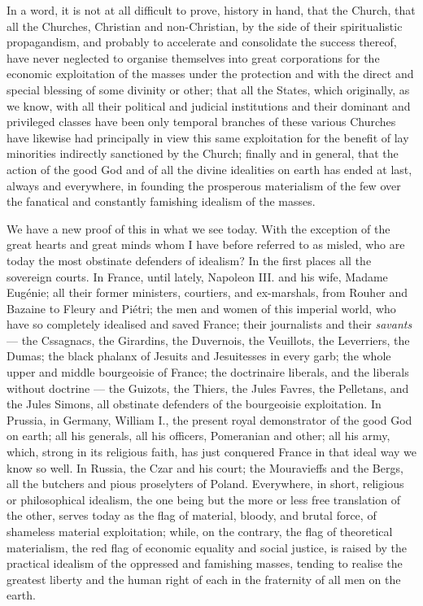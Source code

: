 \documentclass[12pt]{report}
\begin{document}
In a word, it is not at all difficult to prove, history in hand, that the Church, that all the Churches, Christian and non-Christian, by the side of their spiritualistic propagandism, and probably to accelerate and consolidate the success thereof, have never neglected to organise themselves into great corporations for the economic exploitation of the masses under the protection and with the direct and special blessing of some divinity or other; that all the States, which originally, as we know, with all their political and judicial institutions and their dominant and privileged classes have been only temporal branches of these various Churches have likewise had principally in view this same exploitation for the benefit of lay minorities indirectly sanctioned by the Church; finally and in general, that the action of the good God and of all the divine idealities on earth has ended at last, always and everywhere, in founding the prosperous materialism of the few over the fanatical and constantly famishing idealism of the masses.


We have a new proof of this in what we see today. With the exception of the great hearts and great minds whom I have before referred to as misled, who are today the most obstinate defenders of idealism? In the first places all the sovereign courts. In France, until lately, Napoleon III. and his wife, Madame Eugénie; all their former ministers, courtiers, and ex-marshals, from Rouher and Bazaine to Fleury and Piétri; the men and women of this imperial world, who have so completely idealised and saved France; their journalists and their \emph{savants} — the Cssagnacs, the Girardins, the Duvernois, the Veuillots, the Leverriers, the Dumas; the black phalanx of Jesuits and Jesuitesses in every garb; the whole upper and middle bourgeoisie of France; the doctrinaire liberals, and the liberals without doctrine — the Guizots, the Thiers, the Jules Favres, the Pelletans, and the Jules Simons, all obstinate defenders of the bourgeoisie exploitation. In Prussia, in Germany, William I., the present royal demonstrator of the good God on earth; all his generals, all his officers, Pomeranian and other; all his army, which, strong in its religious faith, has just conquered France in that ideal way we know so well. In Russia, the Czar and his court; the Mouravieffs and the Bergs, all the butchers and pious proselyters of Poland. Everywhere, in short, religious or philosophical idealism, the one being but the more or less free translation of the other, serves today as the flag of material, bloody, and brutal force, of shameless material exploitation; while, on the contrary, the flag of theoretical materialism, the red flag of economic equality and social justice, is raised by the practical idealism of the oppressed and famishing masses, tending to realise the greatest liberty and the human right of each in the fraternity of all men on the earth.
\end{document}
